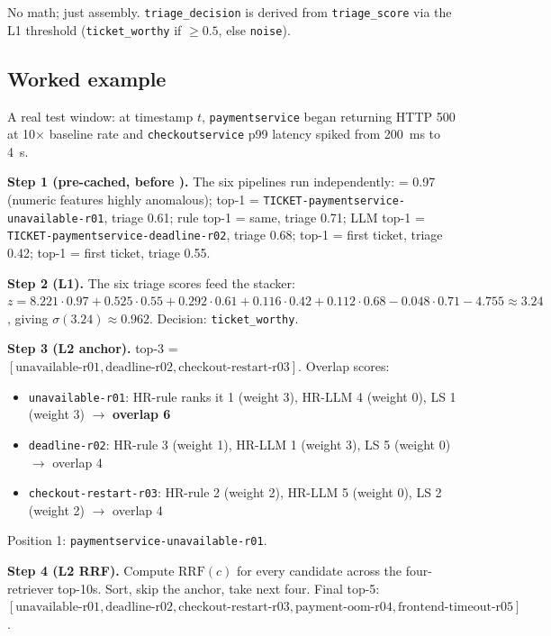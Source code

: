 No math; just assembly. \texttt{triage\_decision} is derived from \texttt{triage\_score} via the L1 threshold (\texttt{ticket\_worthy} if $\geq 0.5$, else \texttt{noise}).

\subsection{Worked example}

A real test window: at timestamp $t$, \texttt{paymentservice} began returning HTTP 500 at 10$\times$ baseline rate and \texttt{checkoutservice} p99 latency spiked from 200~ms to 4~s.

\textbf{Step 1 (pre-cached, before \tch).} The six pipelines run independently:
\hgb{} = 0.97 (numeric features highly anomalous);
\bienc{} top-1 = \texttt{TICKET-paymentservice-unavailable-r01}, triage 0.61;
\hrrf{} rule top-1 = same, triage 0.71;
\hrrf{} LLM top-1 = \texttt{TICKET-paymentservice-deadline-r02}, triage 0.68;
\logseq{} top-1 = first ticket, triage 0.42;
\kgret{} top-1 = first ticket, triage 0.55.

\textbf{Step 2 (L1).} The six triage scores feed the stacker: $z = 8.221 \cdot 0.97 + 0.525 \cdot 0.55 + 0.292 \cdot 0.61 + 0.116 \cdot 0.42 + 0.112 \cdot 0.68 - 0.048 \cdot 0.71 - 4.755 \approx 3.24$, giving $\sigma(3.24) \approx 0.962$. Decision: \texttt{ticket\_worthy}.

\textbf{Step 3 (L2 anchor).} \bienc{} top-3 = $[\text{unavailable-r01}, \text{deadline-r02}, \text{checkout-restart-r03}]$. Overlap scores:

\begin{itemize}
\item \texttt{unavailable-r01}: HR-rule ranks it 1 (weight 3), HR-LLM 4 (weight 0), LS 1 (weight 3) $\to$ \textbf{overlap 6}
\item \texttt{deadline-r02}: HR-rule 3 (weight 1), HR-LLM 1 (weight 3), LS 5 (weight 0) $\to$ overlap 4
\item \texttt{checkout-restart-r03}: HR-rule 2 (weight 2), HR-LLM 5 (weight 0), LS 2 (weight 2) $\to$ overlap 4
\end{itemize}

Position 1: \texttt{paymentservice-unavailable-r01}.

\textbf{Step 4 (L2 RRF).} Compute $\mathrm{RRF}(c)$ for every candidate across the four-retriever top-10s. Sort, skip the anchor, take next four. Final top-5: $[\text{unavailable-r01}, \text{deadline-r02}, \text{checkout-restart-r03}, \text{payment-oom-r04}, \text{frontend-timeout-r05}]$.

